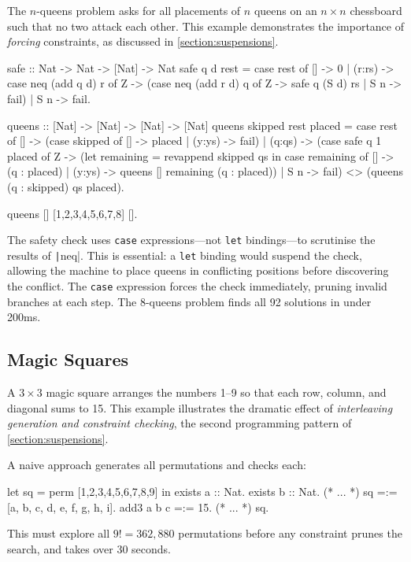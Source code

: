 The $n$-queens problem asks for all placements of $n$ queens on an $n \times n$
chessboard such that no two attack each other. This example demonstrates the
importance of \emph{forcing} constraints, as discussed in
\cref{section:suspensions}.
%
\begin{haskellcode}
safe :: Nat -> Nat -> [Nat] -> Nat
safe q d rest = case rest of
    [] -> 0
  | (r:rs) -> case neq (add q d) r of
        Z -> (case neq (add r d) q of
            Z -> safe q (S d) rs
          | S n -> fail)
      | S n -> fail.

queens :: [Nat] -> [Nat] -> [Nat] -> [Nat]
queens skipped rest placed = case rest of
    [] -> (case skipped of
        [] -> placed
      | (y:ys) -> fail)
  | (q:qs) ->
      (case safe q 1 placed of
         Z -> (let remaining = revappend skipped qs in
               case remaining of
                 [] -> (q : placed)
               | (y:ys) -> queens [] remaining (q : placed))
       | S n -> fail)
      <>
      (queens (q : skipped) qs placed).

queens [] [1,2,3,4,5,6,7,8] [].
\end{haskellcode}
%
\noindent The safety check uses \texttt{case} expressions---not \texttt{let}
bindings---to scrutinise the results of \texttt|neq|. This is
essential: a \texttt{let} binding would suspend the check, allowing the machine
to place queens in conflicting positions before discovering the conflict. The
\texttt{case} expression forces the check immediately, pruning invalid branches
at each step. The 8-queens problem finds all 92 solutions in under 200ms.

\subsection{Magic Squares}

A $3 \times 3$ magic square arranges the numbers 1--9 so that each row, column,
and diagonal sums to 15. This example illustrates the dramatic effect of
\emph{interleaving generation and constraint checking}, the second programming
pattern of \cref{section:suspensions}.

A naive approach generates all permutations and checks each:
%
\begin{haskellcode}
let sq = perm [1,2,3,4,5,6,7,8,9] in
exists a :: Nat. exists b :: Nat. (* ... *)
sq =:= [a, b, c, d, e, f, g, h, i].
add3 a b c =:= 15. (* ... *)
sq.
\end{haskellcode}
%
\noindent This must explore all $9! = 362{,}880$ permutations before any
constraint prunes the search, and takes over 30 seconds.

